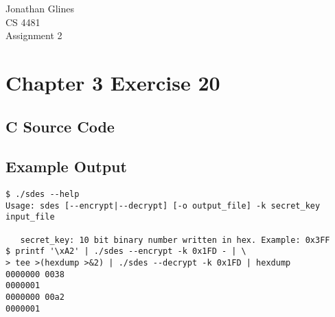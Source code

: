 \documentclass[12pt]{article}
\begin{document}
\begin{flushright}
{
\Large Jonathan Glines\\
\Large CS 4481\\
\Large Assignment 2\\
}
\end{flushright}
\section*{Chapter 3 Exercise 20}
\subsection*{C Source Code}

\subsection*{Example Output}
\begin{verbatim}
$ ./sdes --help
Usage: sdes [--encrypt|--decrypt] [-o output_file] -k secret_key input_file

   secret_key: 10 bit binary number written in hex. Example: 0x3FF
$ printf '\xA2' | ./sdes --encrypt -k 0x1FD - | \
> tee >(hexdump >&2) | ./sdes --decrypt -k 0x1FD | hexdump
0000000 0038                                   
0000001
0000000 00a2                                   
0000001
\end{verbatim}
\end{document}
